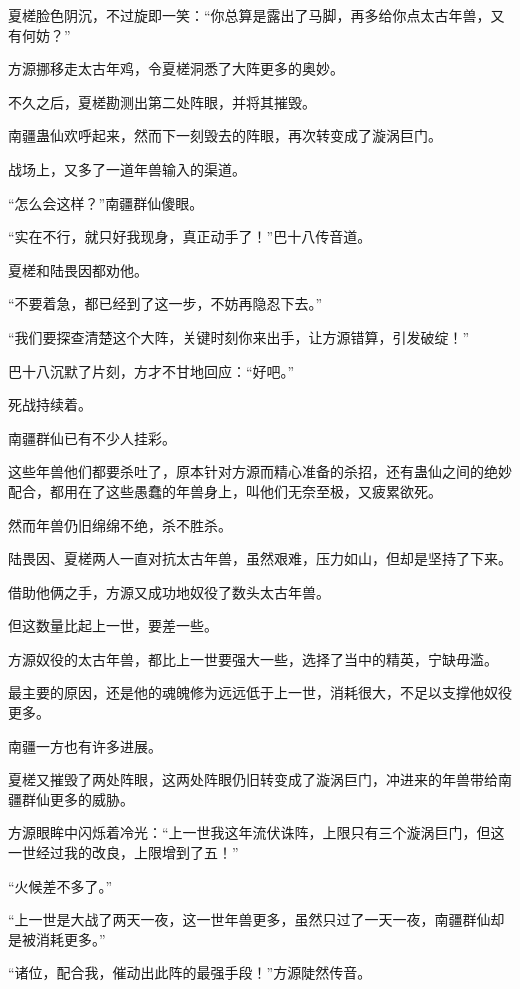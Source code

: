 \begin{this_body}
夏槎脸色阴沉，不过旋即一笑：“你总算是露出了马脚，再多给你点太古年兽，又有何妨？”

方源挪移走太古年鸡，令夏槎洞悉了大阵更多的奥妙。

不久之后，夏槎勘测出第二处阵眼，并将其摧毁。

南疆蛊仙欢呼起来，然而下一刻毁去的阵眼，再次转变成了漩涡巨门。

战场上，又多了一道年兽输入的渠道。

“怎么会这样？”南疆群仙傻眼。

“实在不行，就只好我现身，真正动手了！”巴十八传音道。

夏槎和陆畏因都劝他。

“不要着急，都已经到了这一步，不妨再隐忍下去。”

“我们要探查清楚这个大阵，关键时刻你来出手，让方源错算，引发破绽！”

巴十八沉默了片刻，方才不甘地回应：“好吧。”

死战持续着。

南疆群仙已有不少人挂彩。

这些年兽他们都要杀吐了，原本针对方源而精心准备的杀招，还有蛊仙之间的绝妙配合，都用在了这些愚蠢的年兽身上，叫他们无奈至极，又疲累欲死。

然而年兽仍旧绵绵不绝，杀不胜杀。

陆畏因、夏槎两人一直对抗太古年兽，虽然艰难，压力如山，但却是坚持了下来。

借助他俩之手，方源又成功地奴役了数头太古年兽。

但这数量比起上一世，要差一些。

方源奴役的太古年兽，都比上一世要强大一些，选择了当中的精英，宁缺毋滥。

最主要的原因，还是他的魂魄修为远远低于上一世，消耗很大，不足以支撑他奴役更多。

南疆一方也有许多进展。

夏槎又摧毁了两处阵眼，这两处阵眼仍旧转变成了漩涡巨门，冲进来的年兽带给南疆群仙更多的威胁。

方源眼眸中闪烁着冷光：“上一世我这年流伏诛阵，上限只有三个漩涡巨门，但这一世经过我的改良，上限增到了五！”

“火候差不多了。”

“上一世是大战了两天一夜，这一世年兽更多，虽然只过了一天一夜，南疆群仙却是被消耗更多。”

“诸位，配合我，催动出此阵的最强手段！”方源陡然传音。

\end{this_body}

